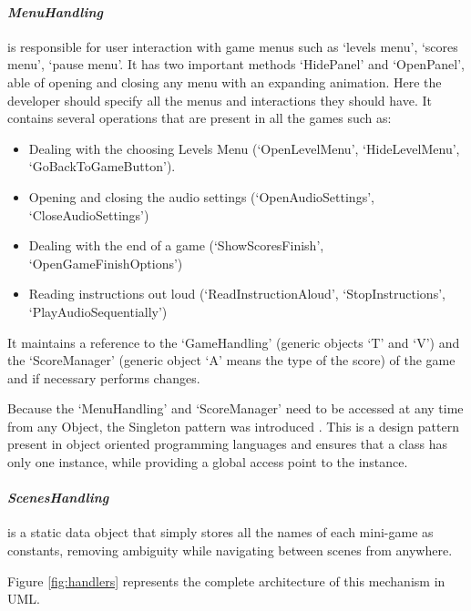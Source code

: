 \paragraph{\textit{MenuHandling}} is responsible for user interaction with game menus such as `levels menu', `scores menu', `pause menu'. It has two important methods `HidePanel' and `OpenPanel', able of opening and closing any menu with an expanding animation. Here the developer should specify all the menus and interactions they should have. It contains several operations that are present in all the games such as:

\begin{itemize}
    \item Dealing with the choosing Levels Menu (`OpenLevelMenu', `HideLevelMenu', `GoBackToGameButton').
    \item Opening and closing the audio settings (`OpenAudioSettings', `CloseAudioSettings')
    \item Dealing with the end of a game (`ShowScoresFinish', `OpenGameFinishOptions')
    \item Reading instructions out loud (`ReadInstructionAloud', `StopInstructions', `PlayAudioSequentially')
\end{itemize}

It maintains a reference to the `GameHandling' (generic objects `T' and `V') and the `ScoreManager' (generic object `A' means the type of the score) of the game and if necessary performs changes.

Because the `MenuHandling' and `ScoreManager' need to be accessed at any time from any Object, the Singleton pattern was introduced \cite{singleton}. This is a design pattern present in object oriented programming languages and ensures that a class has only one instance, while providing a global access point to the instance.

\paragraph{\textit{ScenesHandling}} is a static data object that simply stores all the names of each mini-game as constants, removing ambiguity while navigating between scenes from anywhere.

Figure \ref{fig:handlers} represents the complete architecture of this mechanism in UML.

